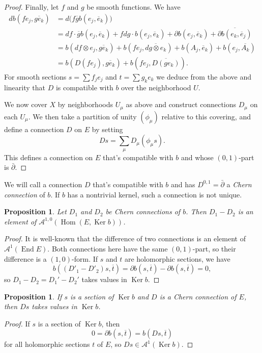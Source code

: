 \documentclass[10pt,a4paper]{amsart}
\newtheorem{prop}[theo]{Proposition}
\theoremstyle{definition}
\newcommand{\cc}[1]{\mathcal{#1}}
\def\ov#1{\overline{#1}}
\DeclareMathOperator{\Ker}{Ker}
\DeclareMathOperator{\End}{End}
\DeclareMathOperator{\Hom}{Hom}
\begin{document}
\begin{proof}
Finally, let $f$ and $g$ be smooth functions. We have
\begin{align*}
d b(fe_j, \ov{ge_k})
&= d\bigl(f \ov g b(e_j, \ov e_k) \bigr)
\\
&= df \cdot \ov g b(e_j, \ov e_k)
+ f dg \cdot b(e_j, \ov e_k)
+ \partial b(e_j, \ov e_k)
+ \ov{\partial b(e_k, \ov e_j)}
\\
&= b(df \otimes e_j, \ov{ge_k})
+ b(f e_j, \ov{dg \otimes e_k})
+ b(A_j, \ov e_k)
+ b(e_j, \ov{A_k})
\\
&= b(D(f e_j), \ov{ge_k}) + b(f e_j, \ov{D(g e_k)}).
\end{align*}
For smooth sections $s = \sum f_j e_j$ and $t = \sum g_k e_k$ we deduce from the above and linearity that $D$ is compatible with $b$ over the neighborhood $U$.

We now cover $X$ by neighborhoods $U_\mu$ as above and construct connections $D_\mu$ on each $U_\mu$. We then take a partition of unity $(\phi_\mu)$ relative to this covering, and define a connection $D$ on $E$ by setting
\[
D s = \sum_\mu D_\mu(\phi_\mu s).
\]
This defines a connection on $E$ that's compatible with $b$ and whose $(0,1)$-part is $\bar\partial$.
\end{proof}



We will call a connection $D$ that's compatible with $b$ and has $D^{0,1} = \bar\partial$ a \emph{Chern connection} of $b$. If $b$ has a nontrivial kernel, such a connection is not unique.


\begin{prop}
Let $D_1$ and $D_2$ be Chern connections of $b$. Then $D_1 - D_2$ is an element of $\cc A^{1,0}(\Hom(E, \Ker b))$.
\end{prop}

\begin{proof}
It is well-known that the difference of two connections is an element of $\cc A^1(\End E)$. Both connections here have the same $(0,1)$-part, so their difference is a $(1,0)$-form. If $s$ and $t$ are holomorphic sections, we have
\[
b((D'_1 - D'_2)s, \ov t)
= \partial b(s, \ov t) - \partial b(s, \ov t) = 0,
\]
so $D_1 - D_2 = D_1' - D_2'$ takes values in $\Ker b$.
\end{proof}


\begin{prop}
If $s$ is a section of $\Ker b$ and $D$ is a Chern connection of $E$, then $Ds$ takes values in $\Ker b$.
\end{prop}

\begin{proof}
If $s$ is a section of $\Ker b$, then
\[
0
= \partial b(s, \ov t)
= b(Ds, \ov t)
\]
for all holomorphic sections $t$ of $E$, so $D s \in \cc A^1(\Ker b)$.
\end{proof}
\end{document}
